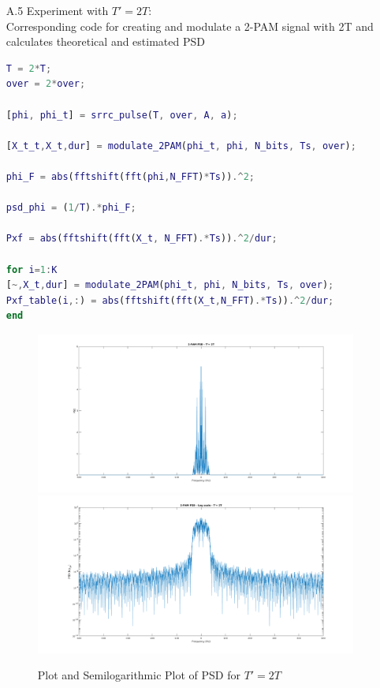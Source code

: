 \documentclass[12pt, a4paper]{article}
\begin{document}
\begin{enumerate}
\begin{enumerate}
	\pagebreak
        \item[A.5] Experiment with \(T' = 2T\):\\
        Corresponding code for creating and modulate a 2-PAM signal with 2T and calculates theoretical and estimated PSD
        \begin{lstlisting}[language=MATLAB]
T = 2*T;
over = 2*over;

[phi, phi_t] = srrc_pulse(T, over, A, a);

[X_t_t,X_t,dur] = modulate_2PAM(phi_t, phi, N_bits, Ts, over);

phi_F = abs(fftshift(fft(phi,N_FFT)*Ts)).^2;

psd_phi = (1/T).*phi_F;

Pxf = abs(fftshift(fft(X_t, N_FFT).*Ts)).^2/dur;

for i=1:K
[~,X_t,dur] = modulate_2PAM(phi_t, phi, N_bits, Ts, over);
Pxf_table(i,:) = abs(fftshift(fft(X_t,N_FFT).*Ts)).^2/dur;
end
        \end{lstlisting}
        \begin{figure}[H]
            \centering
            \noindent\includegraphics[width=\textwidth]{2PAM_PSD_PLOT_2T.png}
            \noindent\includegraphics[width=\textwidth]{PAM_PSD_2T.png}
            \caption{Plot and Semilogarithmic Plot of PSD for \(T' = 2T\)}

\end{figure}
\end{enumerate}
\end{enumerate}
\end{document}
